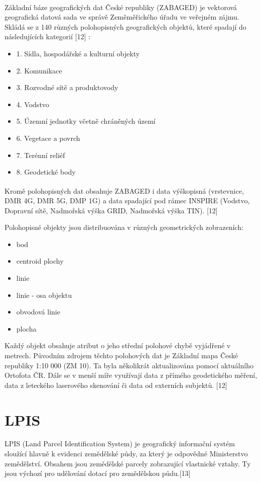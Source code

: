 \documentclass[a4paper,oneside,12pt]{book}
\begin{document}
\hspace{10mm} Základní báze geografických dat České republiky (ZABAGED\texorpdfstring{\textsuperscript{\textregistered}}{ (R)}) je vektorová geografická datová sada ve správě Zeměměřického úřadu ve veřejném zájmu. Skládá se z 140 různých polohopisných geografických objektů, které spadají do následujících kategorií [12] :
\begin{itemize}
\item 1. Sídla, hospodářské a kulturní objekty
\item 2. Komunikace
\item 3. Rozvodné sítě a produktovody
\item 4. Vodstvo 
\item 5. Územní jednotky včetně chráněných území
\item 6. Vegetace a povrch
\item 7. Terénní reliéf
\item 8. Geodetické body
\end{itemize}
\hspace{10mm} Kromě polohopisných dat obsahuje ZABAGED\texorpdfstring{\textsuperscript{\textregistered}}{ (R)} i data výškopisná (vrstevnice, DMR 4G, DMR 5G, DMP 1G) a data spadající pod rámec INSPIRE (Vodstvo, Dopravní sítě, Nadmořská výška GRID, Nadmořská výška TIN). [12] 


\hspace{10mm} Polohopisné objekty jsou distribuována v různých geometrických zobrazeních:
\begin{itemize}
\item bod
\item centroid plochy
\item linie
\item linie - osa objektu
\item obvodová linie
\item plocha
\end{itemize}

\hspace{10mm} Každý objekt obsahuje atribut o jeho střední polohové chybě vyjádřené v metrech. Původním zdrojem těchto polohových dat je Základní mapa České republiky 1:10 000 (ZM 10). Ta byla několikrát aktualizována pomocí aktuálního Ortofota ČR. Dále se v menší míře využívají data z přímého geodetického měření, data z leteckého laserového
skenování či data od externích subjektů. [12] 


\section{LPIS} \label{lpis}
\hspace{10mm} LPIS (Land Parcel Identification System) je geografický informační systém sloužící hlavně k evidenci zemědělské půdy, za který je odpovědné Ministerstvo zemědělství. Obsahem jsou zemědělské parcely zobrazující vlastnické vztahy. Ty jsou výchozí pro udělování dotací pro zemědělskou půdu.[13] 
\end{document}
